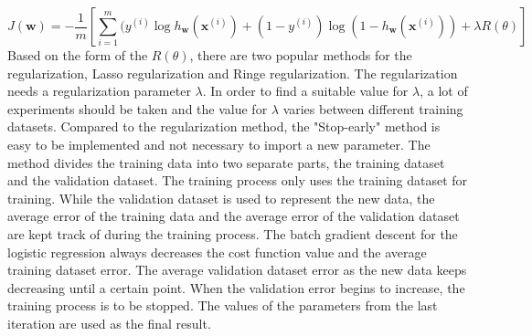 \begin{equation}
J(\textbf{w})= - \frac{1}{m}[\sum_{i=1}^m (y^{(i)}\log h_\textbf{w}(\textbf{x}^{(i)}) +(1-y^{(i)})\log (1-h_\textbf{w}(\textbf{x}^{(i)}))+\lambda R(\theta)]
\end{equation} 
Based on the form of the $R(\theta)$,  there are two popular methods for the regularization, Lasso regularization and Ringe regularization. The regularization needs a regularization parameter $\lambda$. In order to find a suitable value for $\lambda$, a lot of experiments should be taken and the value for $\lambda$ varies between different training datasets. Compared to the regularization method, the "Stop-early" method is easy to be implemented and not necessary to import a new parameter. The method divides the training data into two separate parts, the training dataset and the validation dataset. The training process only uses the training dataset for training. While the validation dataset is used to represent the new data, the average error of the training data and the average error of the validation dataset are kept track of during the training process. The batch gradient descent for the logistic regression  always decreases the cost function value and the average training dataset error. The average validation  dataset error as the new data  keeps decreasing until a certain point. When the validation error begins to increase, the training process is to be stopped. The values of the parameters from the last iteration are used as the final result.
 
